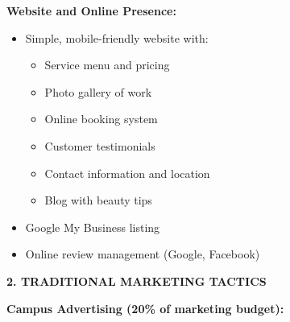\textbf{Website and Online Presence:}
\begin{itemize}[leftmargin=2em]
    \item Simple, mobile-friendly website with:
    \begin{itemize}
        \item Service menu and pricing
        \item Photo gallery of work
        \item Online booking system
        \item Customer testimonials
        \item Contact information and location
        \item Blog with beauty tips
    \end{itemize}
    \item Google My Business listing
    \item Online review management (Google, Facebook)
\end{itemize}

\vspace{1em}

\textbf{2. TRADITIONAL MARKETING TACTICS}

\textbf{Campus Advertising (20\% of marketing budget):}

